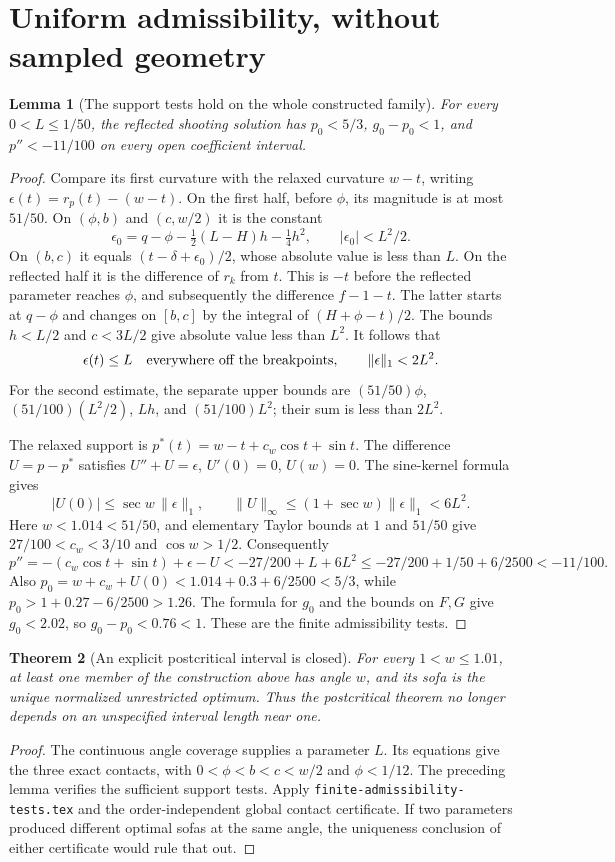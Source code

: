 \documentclass[11pt]{article}
\newtheorem{theorem}{Theorem}[section]
\newtheorem{lemma}[theorem]{Lemma}
\begin{document}
\section{Uniform admissibility, without sampled geometry}
\begin{lemma}[The support tests hold on the whole constructed family]
For every $0<L\le1/50$, the reflected shooting solution has $p_0<5/3$, $g_0-p_0<1$, and $p''<-11/100$ on every open coefficient interval.
\end{lemma}
\begin{proof}
Compare its first curvature with the relaxed curvature $w-t$, writing $\epsilon(t)=r_p(t)-(w-t)$. On the first half, before $\phi$, its magnitude is at most $51/50$. On $(\phi,b)$ and $(c,w/2)$ it is the constant
\[
 \epsilon_0=q-\phi-\tfrac12(L-H)h-\tfrac14h^2,
 \qquad |\epsilon_0|<L^2/2.
\]
On $(b,c)$ it equals $(t-\delta+\epsilon_0)/2$, whose absolute value is less than $L$. On the reflected half it is the difference of $r_k$ from $t$. This is $-t$ before the reflected parameter reaches $\phi$, and subsequently the difference $f-1-t$. The latter starts at $q-\phi$ and changes on $[b,c]$ by the integral of $(H+\phi-t)/2$. The bounds $h<L/2$ and $c<3L/2$ give absolute value less than $L^2$. It follows that
\[
 \epsilon(t)\le L\quad\hbox{everywhere off the breakpoints},\qquad
 \|\epsilon\|_1<2L^2.
\]
For the second estimate, the separate upper bounds are
$(51/50)\phi$, $(51/100)(L^2/2)$, $Lh$, and $(51/100)L^2$; their sum is less than $2L^2$.

The relaxed support is $p^*(t)=w-t+c_w\cos t+\sin t$. The difference $U=p-p^*$ satisfies $U''+U=\epsilon$, $U'(0)=0$, $U(w)=0$. The sine-kernel formula gives
\[
 |U(0)|\le\sec w\,\|\epsilon\|_1,\qquad
 \|U\|_\infty\le(1+\sec w)\|\epsilon\|_1<6L^2.
\]
Here $w<1.014<51/50$, and elementary Taylor bounds at $1$ and $51/50$ give $27/100<c_w<3/10$ and $\cos w>1/2$. Consequently
\[
 p''=-(c_w\cos t+\sin t)+\epsilon-U
 <-27/200+L+6L^2\le-27/200+1/50+6/2500<-11/100.
\]
Also $p_0=w+c_w+U(0)<1.014+0.3+6/2500<5/3$, while $p_0>1+0.27-6/2500>1.26$. The formula for $g_0$ and the bounds on $F,G$ give $g_0<2.02$, so $g_0-p_0<0.76<1$. These are the finite admissibility tests.
\end{proof}

\begin{theorem}[An explicit postcritical interval is closed]
For every $1<w\le1.01$, at least one member of the construction above has angle $w$, and its sofa is the unique normalized unrestricted optimum. Thus the postcritical theorem no longer depends on an unspecified interval length near one.
\end{theorem}
\begin{proof}
The continuous angle coverage supplies a parameter $L$. Its equations give the three exact contacts, with $0<\phi<b<c<w/2$ and $\phi<1/12$. The preceding lemma verifies the sufficient support tests. Apply \texttt{finite-admissibility-tests.tex} and the order-independent global contact certificate. If two parameters produced different optimal sofas at the same angle, the uniqueness conclusion of either certificate would rule that out.
\end{proof}
\end{document}
